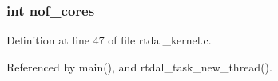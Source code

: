 \subsubsection[{nof\-\_\-cores}]{\setlength{\rightskip}{0pt plus 5cm}int nof\-\_\-cores}\label{rtdal__task_8c_a963897f83bd39432e5c50dee715eb2f9}


Definition at line 47 of file rtdal\-\_\-kernel.\-c.



Referenced by main(), and rtdal\-\_\-task\-\_\-new\-\_\-thread().

